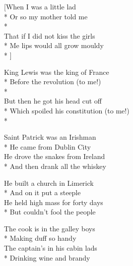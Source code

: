
[When I was a little lad\\*
Or so my mother told me\\*
\vin{}\\
That if I did not kiss the girls\\*
Me lips would all grow mouldy\\*
\vin{}]


\versemark
King Lewis was the king of France\\*
Before the revolution (to me!)\\*
\vin{}\\
But then he got his head cut off\\*
Which spoiled his constitution (to me!)\\*
\vin{}

\versemark
Saint Patrick was an Irishman\\*
He came from Dublin City\etc\\
He drove the snakes from Ireland\\*
And then drank all the whiskey\etcrefrain

\versemark
He built a church in Limerick\\*
And on it put a steeple\etc\\
He held high mass for forty days\\*
But couldn’t fool the people\etcrefrain

\versemark
The cook is in the galley boys\\*
Making duff so handy\etc\\
The captain’s in his cabin lads\\*
Drinking wine and brandy\etcrefrain

